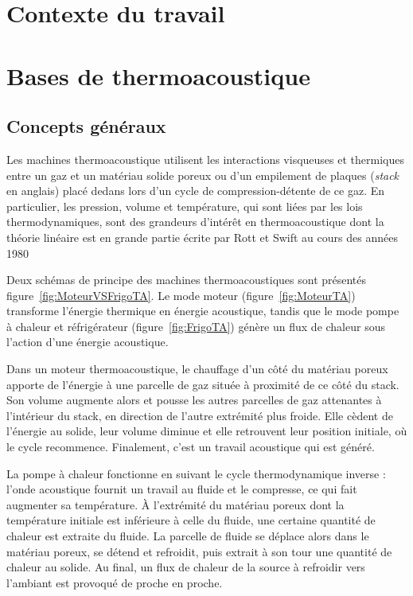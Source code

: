 \section{Contexte du travail}

\section{Bases de thermoacoustique}
\subsection{Concepts généraux}
Les machines thermoacoustique utilisent les interactions visqueuses et thermiques entre un gaz et un matériau solide poreux ou d’un empilement de plaques (\textit{stack} en anglais) placé dedans lors d’un cycle de compression-détente de ce gaz. En particulier, les pression, volume et température, qui sont liées par les lois thermodynamiques, sont des grandeurs d’intérêt en thermoacoustique dont la théorie linéaire est en grande partie écrite par Rott et Swift au cours des années 1980 \cite{rott_damped_1969, rott_thermally_1973, rott_thermally_1975, rott_thermally_1976, zouzoulas_thermally_1976, rott_thermoacoustics_1980, muller_thermally_1983}

Deux schémas de principe des machines thermoacoustiques sont présentés figure~\ref{fig:MoteurVSFrigoTA}. Le mode moteur (figure~\ref{fig:MoteurTA}) transforme l’énergie thermique en énergie acoustique, tandis que le mode pompe à chaleur et réfrigérateur (figure~\ref{fig:FrigoTA}) génère un flux de chaleur sous l'action d'une énergie acoustique. 

Dans un moteur thermoacoustique, le chauffage d'un côté du matériau poreux apporte de l'énergie à une parcelle de gaz située à proximité de ce côté du stack. Son volume augmente alors et pousse les autres parcelles de gaz attenantes à l'intérieur du stack, en direction de l'autre extrémité plus froide. Elle cèdent de l'énergie au solide, leur volume diminue et elle retrouvent leur position initiale, où le cycle recommence. Finalement, c'est un travail acoustique qui est généré.

La pompe à chaleur fonctionne en suivant le cycle thermodynamique inverse : l'onde acoustique fournit un travail au fluide et le compresse, ce qui fait augmenter sa température. À l'extrémité du matériau poreux dont la température initiale est inférieure à celle du fluide, une certaine quantité de chaleur est extraite du fluide. La parcelle de fluide se déplace alors dans le matériau poreux, se détend et refroidit, puis extrait à son tour une quantité de chaleur au solide. Au final, un flux de chaleur de la source à refroidir vers l'ambiant est provoqué de proche en proche.\smallskip

